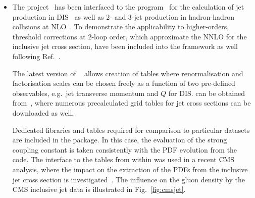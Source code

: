 \begin{description}
\begin{itemize}
  \item The \fastnlo project~\cite{Kluge:2006xs} has been interfaced
    to the \nlojetpp program~\cite{Nagy:1998bb} for the calculation of
    jet production in DIS~\cite{Nagy:2001xb} as well as 2- and 3-jet
    production in hadron-hadron collisions at
    NLO~\cite{Nagy:2003tz,Nagy:2001fj}. To demonstrate the
    applicability to higher-orders, threshold corrections at 2-loop
    order, which approximate the NNLO for the inclusive jet cross
    section, have been included into the framework as
    well~\cite{Wobisch:2011ij} following Ref.~\cite{Kidonakis:2000gi}.

    The latest version of \fastnlo~\cite{Britzger:2012bs} allows 
    creation of tables where renormalisation and factorisation scales
    can be chosen
    freely as a function of two pre-defined observables, e.g.\ jet
    transverse momentum \pperp and $Q$ for DIS\@. 
    \fastnlo can be obtained from~\cite{fastNLO:HepForge}, where
    numerous precalculated grid tables for jet cross sections can be
    downloaded as well. 

    Dedicated \fastnlo libraries and tables required for comparison to
    particular datasets are included in the \fitter package. In this
    case, the evaluation of the strong coupling constant is taken
    consistently with the PDF evolution from the \qcdnum code. The
    interface to the \fastnlo tables from within \fitter was used in a
    recent CMS analysis, where the impact on the
    extraction of the PDFs from the inclusive jet cross section is
    investigated~\cite{cms:jets}. The influence on the gluon density by
    the CMS inclusive jet data is illustrated in Fig.~\ref{fig:cmsjet}.


\end{itemize}
\end{description}
